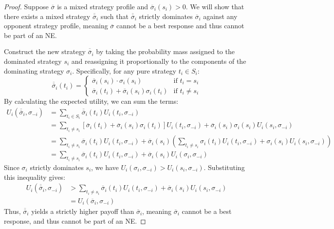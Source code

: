 \documentclass[12pt, a4paper]{article}
\begin{document}
\begin{proof}
  Suppose $\overline{\sigma}$ is a mixed strategy profile and $\overline{\sigma}_i(s_i) > 0$. We will show that there exists a mixed strategy $\overline{\overline{\sigma}}_i$ such that $\overline{\overline{\sigma}}_i$ strictly dominates $\overline{\sigma}_i$ against any opponent strategy profile, meaning $\overline{\sigma}$ cannot be a best response and thus cannot be part of an NE.
  
  Construct the new strategy $\overline{\overline{\sigma}}_i$ by taking the probability mass assigned to the dominated strategy $s_i$ and reassigning it proportionally to the components of the dominating strategy $\sigma_i$. Specifically, for any pure strategy $t_i \in S_i$:
  \[
    \overline{\overline{\sigma}}_i(t_i) = \begin{cases}
      \overline{\sigma}_i(s_i) \cdot \sigma_i(s_i) & \text{if } t_i = s_i \\
      \overline{\sigma}_i(t_i) + \overline{\sigma}_i(s_i) \sigma_i(t_i) & \text{if } t_i \neq s_i
    \end{cases}
  \]
  By calculating the expected utility, we can sum the terms:
  \begin{align*}
    U_i(\overline{\overline{\sigma}}_i, \sigma_{-i}) &= \sum_{t_i \in S_i} \overline{\overline{\sigma}}_i(t_i) U_i(t_i, \sigma_{-i}) \\
    &= \sum_{t_i \neq s_i} \left[ \overline{\sigma}_i(t_i) + \overline{\sigma}_i(s_i)\sigma_i(t_i) \right] U_i(t_i, \sigma_{-i}) + \overline{\sigma}_i(s_i)\sigma_i(s_i)U_i(s_i, \sigma_{-i}) \\
    &= \sum_{t_i \neq s_i} \overline{\sigma}_i(t_i) U_i(t_i, \sigma_{-i}) + \overline{\sigma}_i(s_i) \left( \sum_{t_i \neq s_i} \sigma_i(t_i) U_i(t_i, \sigma_{-i}) + \sigma_i(s_i)U_i(s_i, \sigma_{-i}) \right) \\
    &= \sum_{t_i \neq s_i} \overline{\sigma}_i(t_i) U_i(t_i, \sigma_{-i}) + \overline{\sigma}_i(s_i) U_i(\sigma_i, \sigma_{-i})
  \end{align*}
  Since $\sigma_i$ strictly dominates $s_i$, we have $U_i(\sigma_i, \sigma_{-i}) > U_i(s_i, \sigma_{-i})$. Substituting this inequality gives:
  \begin{align*}
    U_i(\overline{\overline{\sigma}}_i, \sigma_{-i}) &> \sum_{t_i \neq s_i} \overline{\sigma}_i(t_i) U_i(t_i, \sigma_{-i}) + \overline{\sigma}_i(s_i) U_i(s_i, \sigma_{-i}) \\
    &= U_i(\overline{\sigma}_i, \sigma_{-i})
  \end{align*}
  Thus, $\overline{\overline{\sigma}}_i$ yields a strictly higher payoff than $\overline{\sigma}_i$, meaning $\overline{\sigma}_i$ cannot be a best response, and thus cannot be part of an NE.
\end{proof}
\end{document}

